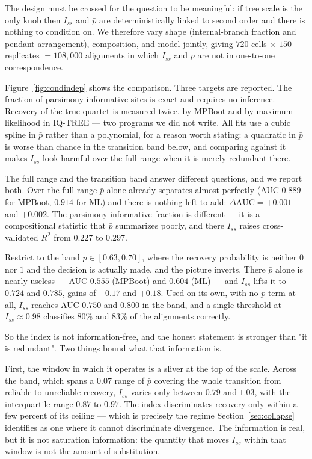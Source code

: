 \documentclass[preprint,12pt,authoryear]{elsarticle}
\newcommand{\Iss}{I_{ss}}
\theoremstyle{definition}
\theoremstyle{remark}
\begin{document}
The design must be crossed for the question to be meaningful: if tree scale
is the only knob then $\Iss$ and $\bar p$ are deterministically linked to
second order and there is nothing to condition on. We therefore vary shape
(internal-branch fraction and pendant arrangement), composition, and model
jointly, giving $720$ cells $\times$ $150$ replicates $= 108{,}000$
alignments in which $\Iss$ and $\bar p$ are not in one-to-one correspondence.

Figure~\ref{fig:condindep} shows the comparison. Three targets are reported.
The fraction of parsimony-informative sites is
exact and requires no inference. Recovery of the true quartet is measured
twice, by MPBoot and by maximum likelihood in IQ-TREE --- two programs we did
not write. All fits use a cubic spline in $\bar p$ rather than a polynomial,
for a reason worth stating: a quadratic in $\bar p$ is worse than chance in
the transition band below, and comparing against it makes $\Iss$ look
harmful over the full range when it is merely redundant there.

The full range and the transition band answer different questions, and we
report both. Over the full range $\bar p$ alone already separates almost
perfectly (AUC $0.889$ for MPBoot, $0.914$ for ML) and there is nothing left
to add: $\Delta\mathrm{AUC}=+0.001$ and $+0.002$. The
parsimony-informative fraction is different --- it is a compositional
statistic that $\bar p$ summarizes poorly, and there $\Iss$ raises
cross-validated $R^2$ from $0.227$ to $0.297$.

Restrict to the band $\bar p\in[0.63,0.70]$, where the recovery probability
is neither $0$ nor $1$ and the decision is actually made, and the picture
inverts. There $\bar p$ alone is nearly useless --- AUC $0.555$ (MPBoot) and
$0.604$ (ML) --- and $\Iss$ lifts it to $0.724$ and $0.785$, gains of $+0.17$
and $+0.18$. Used on its own, with no $\bar p$ term at all, $\Iss$ reaches
AUC $0.750$ and $0.800$ in the band, and a single threshold at
$\Iss\approx0.98$ classifies $80\%$ and $83\%$ of the alignments correctly.

So the index is not information-free, and the honest statement is stronger
than "it is redundant". Two things bound what that information is.

First, the window in which it operates is a sliver at the top of the scale.
Across the band, which spans a $0.07$ range of $\bar p$ covering the whole
transition from reliable to unreliable recovery, $\Iss$ varies only between
$0.79$ and $1.03$, with the interquartile range $0.87$ to $0.97$. The index
discriminates recovery only within a few percent of its ceiling --- which is
precisely the regime Section~\ref{sec:collapse} identifies as one where it
cannot discriminate divergence. The information is real, but it is not
saturation information: the quantity that moves $\Iss$ within that window is
not the amount of substitution.
\end{document}
